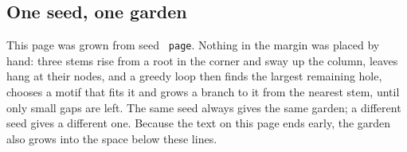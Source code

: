 \documentclass[11pt,a4paper]{article}
\begin{document}
\ifdefined\galleryage\florilegiumage{\galleryage}\fi
\setcounter{section}{3}\setcounter{subsection}{1}
\subsection{One seed, one garden}

This page was grown from seed \texttt{\ifx\florilegiumseed\empty
page\else\florilegiumseed\fi}.
Nothing in the margin was placed by hand: three stems rise from a
root in the corner and
sway up the column, leaves hang at their nodes, and a greedy loop
then finds the largest
remaining hole, chooses a motif that fits it and grows a branch to it
from the nearest
stem, until only small gaps are left. The same seed always gives the
same garden; a
different seed gives a different one. Because the text on this page
ends early, the
garden also grows into the space below these lines.
\florilegiumtextend
\end{document}
